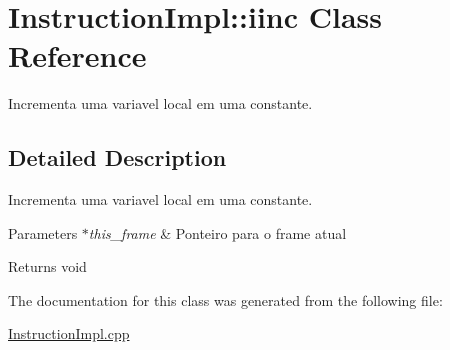 \hypertarget{class_instruction_impl_1_1iinc}{}\section{Instruction\+Impl\+:\+:iinc Class Reference}
\label{class_instruction_impl_1_1iinc}


Incrementa uma variavel local em uma constante.  




\subsection{Detailed Description}
Incrementa uma variavel local em uma constante. 


\begin{DoxyParams}{Parameters}
{\em $\ast$this\+\_\+frame} & Ponteiro para o frame atual \\
\hline
\end{DoxyParams}
\begin{DoxyReturn}{Returns}
void 
\end{DoxyReturn}


The documentation for this class was generated from the following file\+:\begin{DoxyCompactItemize}
\item 
\hyperlink{_instruction_impl_8cpp}{Instruction\+Impl.\+cpp}\end{DoxyCompactItemize}
